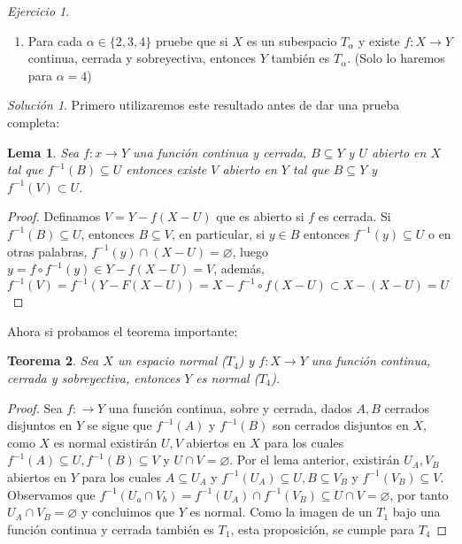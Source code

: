 \documentclass[notitlepage]{report}
\newtheorem{thm}{Teorema}
\newtheorem{lem}[thm]{Lema}
\theoremstyle{definition}
\theoremstyle{remark}
\newtheorem{exc}{Ejercicio}
\newtheorem*{sol}{Solución}
\newcommand{\inv}{^{-1}}
\begin{document}
\begin{exc}
	\begin{enumerate}
		\item Para cada $ \alpha \in \{2,3,4\} $ pruebe que si $ X $ es un subespacio $ T_\alpha $ y existe $ f:X \to Y $ continua, cerrada y sobreyectiva, entonces $ Y $ también es $ T_\alpha $. (Solo lo haremos para $ \alpha = 4 $)
		\end{enumerate}
\end{exc}
\begin{sol}
	Primero utilizaremos este resultado antes de dar una prueba completa:
	\begin{lem}
		Sea $ f: x \rightarrow Y $ una función continua y cerrada, $ B \subseteq Y $ y $ U $ abierto en $ X $ tal que $ f \inv (B) \subseteq U $ entonces existe $ V  $ abierto en $ Y $ tal que $ B \subseteq Y $ y $ f\inv (V) \subset U $.
	\end{lem}
	\begin{proof}
		Definamos $ V = Y - f(X - U) $ que es abierto si $ f $ es cerrada. Si $ f\inv (B) \subseteq U $, entonces $ B \subseteq V $, en particular, si $ y \in B $ entonces $ f\inv(y) \subseteq U $ o en otras palabras, $ f\inv(y) \cap (X - U) = \varnothing $, luego $ y = f \circ f\inv(y) \in Y - f(X - U) = V $, además, $ f\inv(V) = f\inv(Y - F(X - U)) = X - f\inv \circ f(X-U) \subset X - (X - U) = U $
	\end{proof}
	Ahora si probamos el teorema importante:
	\begin{thm}
		Sea $ X $ un espacio normal ($ T_4 $) y $ f: X \rightarrow Y $ una función continua, cerrada y sobreyectiva, entonces $ Y $ es normal ($ T_4 $).
	\end{thm}
	\begin{proof}
		Sea $ f: \rightarrow Y $ una función continua, sobre y cerrada, dados $ A,B $ cerrados disjuntos en $ Y $ se sigue que $ f\inv(A)  $ y $  f\inv(B) $ son cerrados disjuntos en $ X $, como $ X $ es normal existirán $ U,V $ abiertos en $ X $ para los cuales $ f\inv(A) \subseteq U, f\inv(B) \subseteq V $ y $ U \cap V = \varnothing $. Por el lema anterior, existirán $ U_A, V_B $ abiertos en $ Y $  para los cuales $ A \subseteq U_A $ y $ f\inv(U_A) \subseteq U, B \subseteq V_B $  y $ f\inv(V_B) \subseteq V $. Observamos que $ f\inv (U_a \cap V_b) = f\inv(U_A) \cap f\inv(V_B) \subseteq U \cap V = \varnothing $, por tanto $ U_A \cap V_B = \varnothing $ y concluimos que $ Y $ es normal. Como la imagen de un $ T_1 $ bajo una función continua y cerrada también es $ T_1 $, esta proposición, se cumple para $ T_4 $
	\end{proof}
\end{sol}
\end{document}
